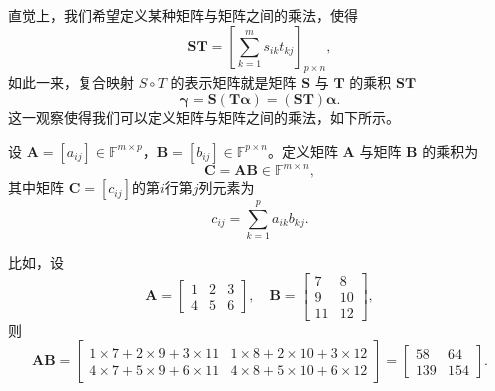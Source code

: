 直觉上，我们希望定义某种矩阵与矩阵之间的乘法，使得
\[
    \mathbf{S}\mathbf{T} = \left[\sum_{k=1}^{m} s_{ik}t_{kj}\right]_{p \times n},
\]
如此一来，复合映射 \(S\circ T\) 的表示矩阵就是矩阵 \(\mathbf{S}\) 与 \(\mathbf{T}\) 的乘积 \(\mathbf{S}\mathbf{T}\)
\[
    \bm{\gamma} = \mathbf{S}(\mathbf{T} \bm{\alpha}) = (\mathbf{S}\mathbf{T})\bm{\alpha}.
\]
这一观察使得我们可以定义矩阵与矩阵之间的乘法，如下所示。
\begin{definition}[矩阵的乘法]
    \label{def_matrix_mult}
    设 \(\mathbf{A}=[a_{ij}]\in \mathbb{F}^{m \times p}\)，\(\mathbf{B}=[b_{ij}]\in \mathbb{F}^{p \times n}\)。定义矩阵 \(\mathbf{A}\) 与矩阵 \(\mathbf{B}\) 的乘积为
    \[
        \mathbf{C} = \mathbf{A}\mathbf{B} \in \mathbb{F}^{m \times n},
    \]
    其中矩阵 \( \mathbf{C} = [c_{ij}] \)的第\( i \)行第\( j \)列元素为
    \[
        c_{ij} = \sum_{k=1}^{p} a_{ik} b_{kj}.
    \]
\end{definition}

比如，设
\[
    \mathbf{A}=
    \begin{bmatrix}
        1 & 2 & 3 \\
        4 & 5 & 6
    \end{bmatrix},
    \quad
    \mathbf{B}=
    \begin{bmatrix}
        7  & 8  \\
        9  & 10 \\
        11 & 12
    \end{bmatrix},
\]
则
\[
    \mathbf{A}\mathbf{B}=
    \begin{bmatrix}
        1\times 7 + 2\times 9 + 3\times 11 & 1\times 8 + 2\times 10 + 3\times 12 \\
        4\times 7 + 5\times 9 + 6\times 11 & 4\times 8 + 5\times 10 + 6\times 12
    \end{bmatrix}=
    \begin{bmatrix}
        58  & 64  \\
        139 & 154
    \end{bmatrix}.
\]

